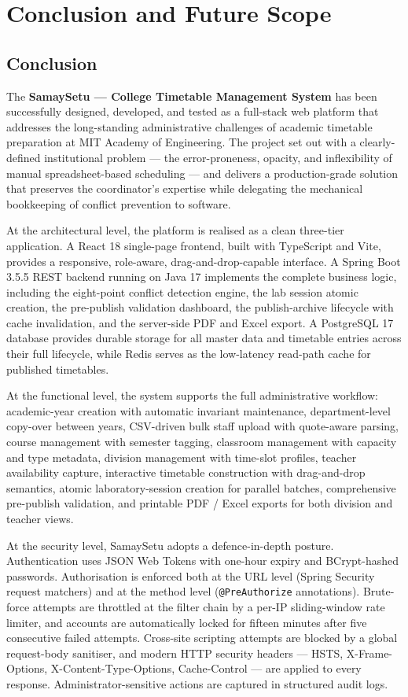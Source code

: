 \newpage
\chapter{Conclusion and Future Scope}

\section{Conclusion}

The \textbf{SamaySetu --- College Timetable Management System} has been successfully designed, developed, and tested as a full-stack web platform that addresses the long-standing administrative challenges of academic timetable preparation at MIT Academy of Engineering. The project set out with a clearly-defined institutional problem --- the error-proneness, opacity, and inflexibility of manual spreadsheet-based scheduling --- and delivers a production-grade solution that preserves the coordinator's expertise while delegating the mechanical bookkeeping of conflict prevention to software.

At the architectural level, the platform is realised as a clean three-tier application. A React 18 single-page frontend, built with TypeScript and Vite, provides a responsive, role-aware, drag-and-drop-capable interface. A Spring Boot 3.5.5 REST backend running on Java 17 implements the complete business logic, including the eight-point conflict detection engine, the lab session atomic creation, the pre-publish validation dashboard, the publish-archive lifecycle with cache invalidation, and the server-side PDF and Excel export. A PostgreSQL 17 database provides durable storage for all master data and timetable entries across their full lifecycle, while Redis serves as the low-latency read-path cache for published timetables.

At the functional level, the system supports the full administrative workflow: academic-year creation with automatic invariant maintenance, department-level copy-over between years, CSV-driven bulk staff upload with quote-aware parsing, course management with semester tagging, classroom management with capacity and type metadata, division management with time-slot profiles, teacher availability capture, interactive timetable construction with drag-and-drop semantics, atomic laboratory-session creation for parallel batches, comprehensive pre-publish validation, and printable PDF / Excel exports for both division and teacher views.

At the security level, SamaySetu adopts a defence-in-depth posture. Authentication uses JSON Web Tokens with one-hour expiry and BCrypt-hashed passwords. Authorisation is enforced both at the URL level (Spring Security request matchers) and at the method level (\texttt{@PreAuthorize} annotations). Brute-force attempts are throttled at the filter chain by a per-IP sliding-window rate limiter, and accounts are automatically locked for fifteen minutes after five consecutive failed attempts. Cross-site scripting attempts are blocked by a global request-body sanitiser, and modern HTTP security headers --- HSTS, X-Frame-Options, X-Content-Type-Options, Cache-Control --- are applied to every response. Administrator-sensitive actions are captured in structured audit logs.

